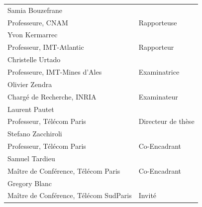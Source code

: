 \documentclass[a4paper]{article}
\newcommand{\jurynameA}{Samia Bouzefrane}
\newcommand{\juryadressA}{Professeure, CNAM}
\newcommand{\juryroleA}{Rapporteuse}%
\newcommand{\jurynameB}{Yvon Kermarrec}
\newcommand{\juryadressB}{Professeur, IMT-Atlantic}
\newcommand{\juryroleB}{Rapporteur}
\newcommand{\jurynameC}{Christelle Urtado}
\newcommand{\juryadressC}{Professeure, IMT-Mines d'Ales}
\newcommand{\juryroleC}{Examinatrice}
\newcommand{\jurynameD}{Olivier Zendra}
\newcommand{\juryadressD}{Chargé de Recherche, INRIA}
\newcommand{\juryroleD}{Examinateur}
\newcommand{\jurynameE}{Laurent Pautet}
\newcommand{\juryadressE}{Professeur, Télécom Paris}
\newcommand{\juryroleE}{Directeur de thèse}
\newcommand{\jurynameF}{Stefano Zacchiroli}
\newcommand{\juryadressF}{Professeur, Télécom Paris}
\newcommand{\juryroleF}{Co-Encadrant}
\newcommand{\jurynameG}{Samuel Tardieu}
\newcommand{\juryadressG}{Maître de Conférence, Télécom Paris}
\newcommand{\juryroleG}{Co-Encadrant}
\newcommand{\jurynameH}{Gregory Blanc}
\newcommand{\juryadressH}{Maître de Conférence, Télécom SudParis}
\newcommand{\juryroleH}{Invité}
\begin{document}
\begin{textblock}{10}
	\label{jury} 																				%
	\begin{flushleft}
	\begin{tabular}{@{} L{9.64cm} R{4.5cm}}
		\jurynameA  \\ \juryadressA & \juryroleA \\[5pt]
		\jurynameB  \\ \juryadressB & \juryroleB \\[5pt]
		\jurynameC  \\ \juryadressC & \juryroleC \\[5pt]
		\jurynameD  \\ \juryadressD & \juryroleD \\[5pt]
		\jurynameE  \\ \juryadressE & \juryroleE \\[5pt]
		\jurynameF  \\ \juryadressF & \juryroleF \\[5pt]
		\jurynameG  \\ \juryadressG & \juryroleG \\[5pt]
		\jurynameH  \\ \juryadressH & \juryroleH \\[5pt]
	\end{tabular} 
	\end{flushleft}   
\end{textblock}
\end{document}
